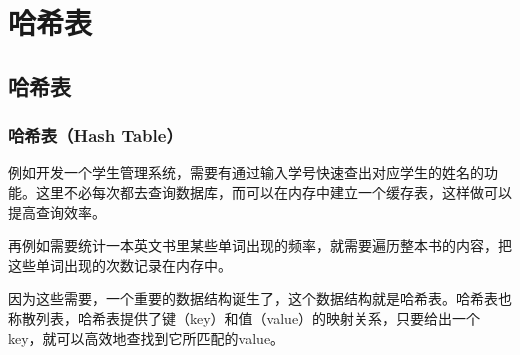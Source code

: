 \chapter{哈希表}

\section{哈希表}

\subsection{哈希表（Hash Table）}

例如开发一个学生管理系统，需要有通过输入学号快速查出对应学生的姓名的功能。这里不必每次都去查询数据库，而可以在内存中建立一个缓存表，这样做可以提高查询效率。

\begin{table}[H]
	\centering
	\caption{学生名单}
\end{table}

再例如需要统计一本英文书里某些单词出现的频率，就需要遍历整本书的内容，把这些单词出现的次数记录在内存中。

\begin{table}[H]
	\centering
	\caption{词频统计}
\end{table}

因为这些需要，一个重要的数据结构诞生了，这个数据结构就是哈希表。哈希表也称散列表，哈希表提供了键（key）和值（value）的映射关系，只要给出一个key，就可以高效地查找到它所匹配的value。\\

